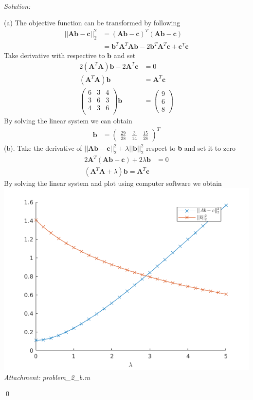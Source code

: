 \documentclass[12pt]{article}
\newenvironment{sol}
    {\emph{Solution:}
    }
    {
    \qed
    }
\begin{document}
\begin{sol}
	(a) The objective function can be transformed by following
	\begin{align*}
		||\textbf{Ab} - \textbf{c}||_2^2 &= (\textbf{Ab} - \textbf{c})^T(\textbf{Ab} - \textbf{c}) \\
										 &= \textbf{b}^T\textbf{A}^T\textbf{Ab} - 2\textbf{b}^T\textbf{A}^T\textbf{c}+\textbf{c}^T\textbf{c}
	\end{align*}
	Take derivative with respective to $\textbf{b}$ and set
	\begin{align*}
		2(\textbf{A}^T\textbf{A})\textbf{b} - 2\textbf{A}^T\textbf{c} &= 0 \\
		(\textbf{A}^T\textbf{A})\textbf{b} &= \textbf{A}^T\textbf{c} \\
		\begin{pmatrix}6 & 3 & 4 \\ 3 & 6 & 3 \\ 4 & 3 & 6 \\\end{pmatrix} \textbf{b} &= \begin{pmatrix}9\\6\\8\end{pmatrix}
	\end{align*}
	By solving the linear system we can obtain 
	\begin{align*}
		\textbf{b} &= \begin{pmatrix}\frac{29}{28} & \frac{3}{14} & \frac{15}{28}\end{pmatrix}^T
	\end{align*}
	(b). Take the derivative of $||\textbf{Ab} - \textbf{c}||_2^2+\lambda||\textbf{b}||_2^2$ respect to \textbf{b} and set it to zero
	\begin{align*}
		2\textbf{A}^T(\textbf{Ab}-\textbf{c}) + 2\lambda\textbf{b} &= 0 \\
		(\textbf{A}^T\textbf{A}+\lambda)\textbf{b} = \textbf{A}^T\textbf{c}
	\end{align*}
	By solving the linear system and plot using computer software we obtain \\
	\includegraphics[width=\linewidth]{./1.png} \\
	\textit{Attachment: problem\_2\_b.m}
\end{sol}
\end{document}
